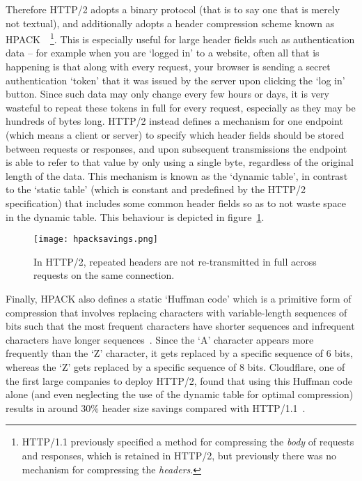 Therefore HTTP/2 adopts a binary protocol (that is to say one that is merely not textual), and additionally adopts a header compression scheme known as HPACK~\cite{hpack}~\footnote{HTTP/1.1 previously specified a method for compressing the \textit{body} of requests and responses, which is retained in HTTP/2, but previously there was no mechanism for compressing the \textit{headers}.}. This is especially useful for large header fields such as authentication data -- for example when you are `logged in' to a website, often all that is happening is that along with every request, your browser is sending a secret authentication `token' that it was issued by the server upon clicking the `log in' button. Since such data may only change every few hours or days, it is very wasteful to repeat these tokens in full for every request, especially as they may be hundreds of bytes long. HTTP/2 instead defines a mechanism for one endpoint (which means a client or server) to specify which header fields should be stored between requests or responses, and upon subsequent transmissions the endpoint is able to refer to that value by only using a single byte, regardless of the original length of the data. This mechanism is known as the `dynamic table', in contrast to the `static table' (which is constant and predefined by the HTTP/2 specification) that includes some common header fields so as to not waste space in the dynamic table. This behaviour is depicted in figure~\ref{fig:hpacksavings}.

\begin{figure}
	\centering
	\texttt{[image: hpacksavings.png]}
	\caption{In HTTP/2, repeated headers are not re\hyp{}transmitted in full across requests on the same connection.}
	\label{fig:hpacksavings}
\end{figure}

Finally, HPACK also defines a static `Huffman code' which is a primitive form of compression that involves replacing characters with variable\hyp{}length sequences of bits such that the most frequent characters have shorter sequences and infrequent characters have  longer sequences~\cite{huffman}. Since the `A' character appears more frequently than the `Z' character, it gets replaced by a specific sequence of 6 bits, whereas the `Z' gets replaced by a specific sequence of 8 bits. Cloudflare, one of the first large companies to deploy HTTP/2, found that using this Huffman code alone (and even neglecting the use of the dynamic table for optimal compression) results in around 30\% header size savings compared with HTTP/1.1~\cite{huffmansavings}.
